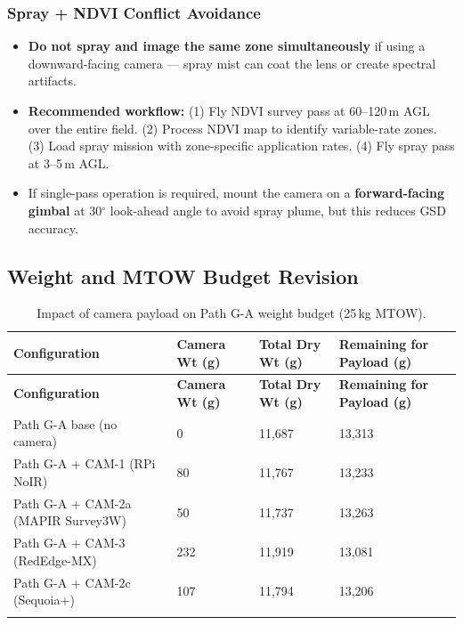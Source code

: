 \documentclass[11pt,a4paper]{article}
\begin{document}
\subsubsection{Spray + NDVI Conflict Avoidance}

\begin{itemize}
\item \textbf{Do not spray and image the same zone simultaneously} if using a downward-facing camera --- spray mist can coat the lens or create spectral artifacts.
\item \textbf{Recommended workflow:} (1) Fly NDVI survey pass at 60--120\,m AGL over the entire field. (2) Process NDVI map to identify variable-rate zones. (3) Load spray mission with zone-specific application rates. (4) Fly spray pass at 3--5\,m AGL.
\item If single-pass operation is required, mount the camera on a \textbf{forward-facing gimbal} at 30$^\circ$ look-ahead angle to avoid spray plume, but this reduces GSD accuracy.
\end{itemize}

\subsection{Weight and MTOW Budget Revision}

\begin{xltabular}{\linewidth}{L{4.0cm}C{1.8cm}C{1.8cm}C{1.8cm}@{}}
\caption{Impact of camera payload on Path G-A weight budget (25\,kg MTOW).}\label{tab:camera-weight}\\
\toprule
\textbf{Configuration} & \textbf{Camera Wt (g)} & \textbf{Total Dry Wt (g)} & \textbf{Remaining for Payload (g)} \\
\midrule
\endfirsthead
\toprule
\textbf{Configuration} & \textbf{Camera Wt (g)} & \textbf{Total Dry Wt (g)} & \textbf{Remaining for Payload (g)} \\
\midrule
\endhead
\bottomrule
\endlastfoot

Path G-A base (no camera) & 0 & 11,687 & 13,313 \\
\addlinespace

Path G-A + CAM-1 (RPi NoIR) & 80 & 11,767 & 13,233 \\
\addlinespace

Path G-A + CAM-2a (MAPIR Survey3W) & 50 & 11,737 & 13,263 \\
\addlinespace

Path G-A + CAM-3 (RedEdge-MX) & 232 & 11,919 & 13,081 \\
\addlinespace

Path G-A + CAM-2c (Sequoia+) & 107 & 11,794 & 13,206 \\
\addlinespace

\end{xltabular}
\end{document}
